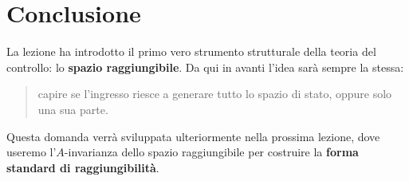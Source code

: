 \begin{center}
\end{center}

\section{Conclusione}

La lezione ha introdotto il primo vero strumento strutturale della teoria del controllo: lo \textbf{spazio raggiungibile}.  
Da qui in avanti l’idea sarà sempre la stessa:

\begin{quote}
capire se l’ingresso riesce a generare tutto lo spazio di stato, oppure solo una sua parte.
\end{quote}

Questa domanda verrà sviluppata ulteriormente nella prossima lezione, dove useremo l’\(A\)-invarianza dello spazio raggiungibile per costruire la \textbf{forma standard di raggiungibilità}.